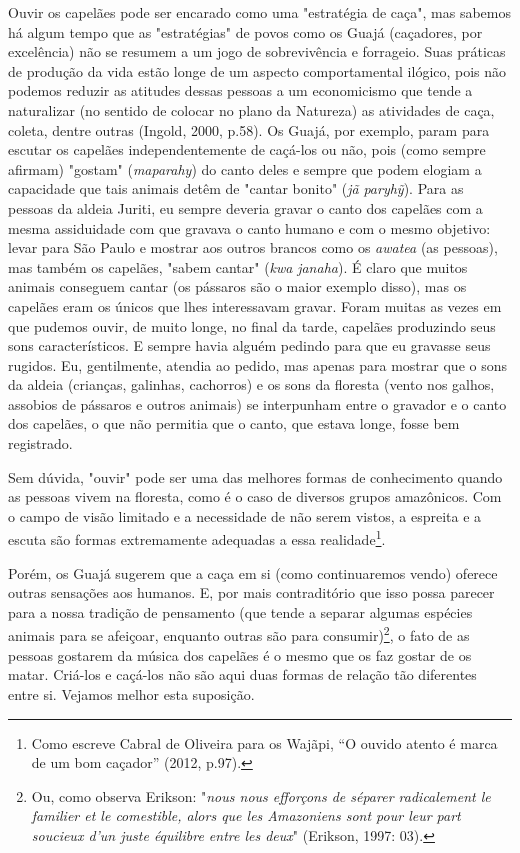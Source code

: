 Ouvir os capelães pode ser encarado como uma "estratégia de caça", mas
sabemos há algum tempo que as "estratégias" de povos como os Guajá
(caçadores, por excelência) não se resumem a um jogo de sobrevivência e
forrageio. Suas práticas de produção da vida estão longe de um aspecto
comportamental ilógico, pois não podemos reduzir as atitudes dessas
pessoas a um economicismo que tende a naturalizar (no sentido de colocar
no plano da Natureza) as atividades de caça, coleta, dentre outras
(Ingold, 2000, p.58). Os Guajá, por exemplo, param para escutar os
capelães independentemente de caçá-los ou não, pois (como sempre
afirmam) "gostam" (\emph{maparahy}) do canto deles e sempre que podem
elogiam a capacidade que tais animais detêm de "cantar bonito"
(\emph{jã} \emph{paryhỹ}). Para as pessoas da aldeia Juriti, eu sempre
deveria gravar o canto dos capelães com a mesma assiduidade com que
gravava o canto humano e com o mesmo objetivo: levar para São Paulo e
mostrar aos outros brancos como os \emph{awatea} (as pessoas), mas
também os capelães, "sabem cantar" (\emph{kwa} \emph{janaha}). É claro
que muitos animais conseguem cantar (os pássaros são o maior exemplo
disso), mas os capelães eram os únicos que lhes interessavam gravar.
Foram muitas as vezes em que pudemos ouvir, de muito longe, no final da
tarde, capelães produzindo seus sons característicos. E sempre havia
alguém pedindo para que eu gravasse seus rugidos. Eu, gentilmente,
atendia ao pedido, mas apenas para mostrar que o sons da aldeia
(crianças, galinhas, cachorros) e os sons da floresta (vento nos galhos,
assobios de pássaros e outros animais) se interpunham entre o gravador e
o canto dos capelães, o que não permitia que o canto, que estava longe,
fosse bem registrado.

Sem dúvida, "ouvir" pode ser uma das melhores formas de conhecimento
quando as pessoas vivem na floresta, como é o caso de diversos grupos
amazônicos. Com o campo de visão limitado e a necessidade de não serem
vistos, a espreita e a escuta são formas extremamente adequadas a essa
realidade\footnote{Como escreve Cabral de Oliveira para os Wajãpi, ``O
  ouvido atento é marca de um bom caçador'' (2012, p.97).}.

Porém, os Guajá sugerem que a caça em si (como continuaremos vendo)
oferece outras sensações aos humanos. E, por mais contraditório que isso
possa parecer para a nossa tradição de pensamento (que tende a separar
algumas espécies animais para se afeiçoar, enquanto outras são para
consumir)\footnote{Ou, como observa Erikson: "\emph{nous nous efforçons
  de séparer radicalement le familier et le comestible, alors que les
  Amazoniens sont pour leur part soucieux d'un juste équilibre entre les
  deux}" (Erikson, 1997: 03).}, o fato de as pessoas gostarem da música
dos capelães é o mesmo que os faz gostar de os matar. Criá-los e
caçá-los não são aqui duas formas de relação tão diferentes entre si.
Vejamos melhor esta suposição.

